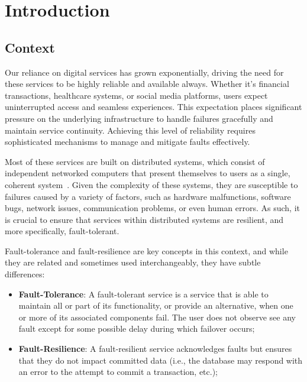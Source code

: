 \chapter{Introduction}\label{ch:introduction}


\section{Context}\label{sec:context}

Our reliance on digital services has grown exponentially, driving the need for these services to be highly reliable and available always.
Whether it's financial transactions, healthcare systems, or social media platforms, users expect uninterrupted access and seamless experiences.
This expectation places significant pressure on the underlying infrastructure to handle failures gracefully and maintain service continuity.
Achieving this level of reliability requires sophisticated mechanisms to manage and mitigate faults effectively.

Most of these services are built on distributed systems,
which consist of independent networked computers that present themselves to users as a single,
coherent system~\cite{fcc-distributed-systems}.
Given the complexity of these systems, they are susceptible to failures caused by a variety of factors, such as hardware malfunctions, software bugs, network issues, communication problems, or even human errors.
As such, it is crucial to ensure that services within distributed systems are resilient, and more specifically, fault-tolerant.

Fault-tolerance and fault-resilience are key concepts in this context, and while they are related and sometimes used interchangeably, they have subtle differences:

\begin{itemize}
    \item {\textbf{Fault-Tolerance}}:
    A fault-tolerant service is a service that is able to maintain all or part of its functionality,
    or provide an alternative, when one or more of its associated components fail.
    The user does not observe see any fault except for some possible delay during which failover occurs;
    \item {\textbf{Fault-Resilience}}: A fault-resilient service acknowledges faults but ensures that they do not impact committed data (i.e., the database may respond with an error to the attempt to commit a transaction, etc.);
\end{itemize}


